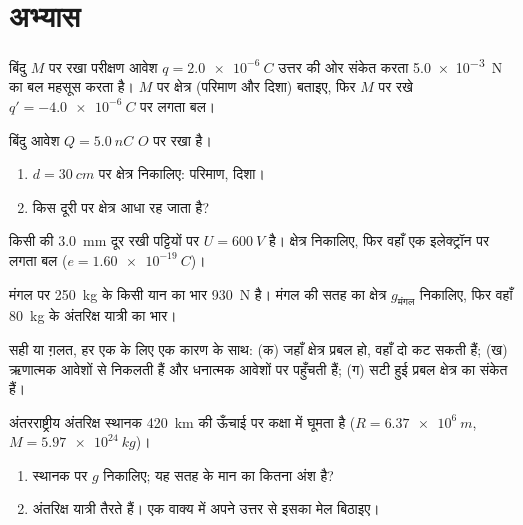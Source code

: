 \section{अभ्यास}

\begin{exercise}[$\star$]\label{exo:g11:electric-gravitational-fields:1}
बिंदु $M$ पर रखा परीक्षण आवेश $q = \qty{+2.0e-6}{C}$ उत्तर की ओर संकेत करता \qty{5.0e-3}{N} का
बल महसूस करता है। $M$ पर क्षेत्र (परिमाण और दिशा)
बताइए, फिर $M$ पर रखे $q' = \qty{-4.0e-6}{C}$ पर लगता बल।
\end{exercise}

\begin{exercise}[$\star$]\label{exo:g11:electric-gravitational-fields:2}
बिंदु आवेश $Q = \qty{+5.0}{nC}$ $O$ पर रखा है।
\begin{enumerate}
  \item $d = \qty{30}{cm}$ पर क्षेत्र निकालिए: परिमाण, दिशा।
  \item किस दूरी पर क्षेत्र आधा रह जाता है?
\end{enumerate}
\end{exercise}

\begin{exercise}[$\star$]\label{exo:g11:electric-gravitational-fields:3}
किसी  की \qty{3.0}{mm} दूर रखी पट्टियों पर $U = \qty{600}{V}$ है।
क्षेत्र निकालिए, फिर वहाँ एक इलेक्ट्रॉन पर लगता बल
($e = \qty{1.60e-19}{C}$)।
\end{exercise}

\begin{exercise}[$\star$]\label{exo:g11:electric-gravitational-fields:4}
मंगल पर \qty{250}{kg} के किसी यान का भार \qty{930}{N} है। मंगल की सतह का
क्षेत्र $g_{\text{मंगल}}$ निकालिए, फिर वहाँ \qty{80}{kg} के अंतरिक्ष यात्री का
भार।
\end{exercise}

\begin{exercise}[$\star$]\label{exo:g11:electric-gravitational-fields:5}
सही या ग़लत, हर एक के लिए एक कारण के साथ: (क) जहाँ क्षेत्र प्रबल
हो, वहाँ दो  कट सकती हैं; (ख)  ऋणात्मक आवेशों से निकलती हैं और धनात्मक आवेशों पर पहुँचती हैं;
(ग) सटी हुई  प्रबल क्षेत्र का
संकेत हैं।
\end{exercise}

\begin{exercise}[$\star\star$]\label{exo:g11:electric-gravitational-fields:6}
अंतरराष्ट्रीय अंतरिक्ष स्थानक \qty{420}{km} की ऊँचाई पर कक्षा में घूमता
है ($R = \qty{6.37e6}{m}$, $M = \qty{5.97e24}{kg}$)।
\begin{enumerate}
  \item स्थानक पर $g$ निकालिए; यह सतह के मान का कितना अंश है?
  \item अंतरिक्ष यात्री तैरते हैं। एक वाक्य में अपने उत्तर से इसका मेल
        बिठाइए।
\end{enumerate}
\end{exercise}

